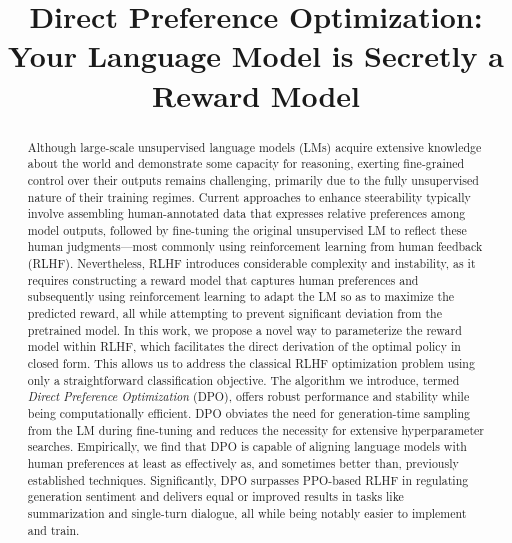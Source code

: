 \title{Direct Preference Optimization: Your Language Model is Secretly a Reward Model}

\begin{abstract}
Although large-scale unsupervised language models (LMs) acquire extensive knowledge about the world and demonstrate some capacity for reasoning, exerting fine-grained control over their outputs remains challenging, primarily due to the fully unsupervised nature of their training regimes. Current approaches to enhance steerability typically involve assembling human-annotated data that expresses relative preferences among model outputs, followed by fine-tuning the original unsupervised LM to reflect these human judgments—most commonly using reinforcement learning from human feedback (RLHF). Nevertheless, RLHF introduces considerable complexity and instability, as it requires constructing a reward model that captures human preferences and subsequently using reinforcement learning to adapt the LM so as to maximize the predicted reward, all while attempting to prevent significant deviation from the pretrained model. In this work, we propose a novel way to parameterize the reward model within RLHF, which facilitates the direct derivation of the optimal policy in closed form. This allows us to address the classical RLHF optimization problem using only a straightforward classification objective. The algorithm we introduce, termed \textit{Direct Preference Optimization} (DPO), offers robust performance and stability while being computationally efficient. DPO obviates the need for generation-time sampling from the LM during fine-tuning and reduces the necessity for extensive hyperparameter searches. Empirically, we find that DPO is capable of aligning language models with human preferences at least as effectively as, and sometimes better than, previously established techniques. Significantly, DPO surpasses PPO-based RLHF in regulating generation sentiment and delivers equal or improved results in tasks like summarization and single-turn dialogue, all while being notably easier to implement and train.
\end{abstract}

